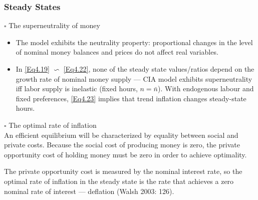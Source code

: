 \documentclass[handout]{beamer}
\begin{document}
\begin{frame}
\small

\frametitle{Steady States}

$\square$ The superneutrality of money \\

\begin{itemize}
\item The model exhibits the neutrality property: proportional
changes in the level of nominal money balances and prices do not affect real
variables.
\item In \eqref{Eq4.19} $\backsim$ \eqref{Eq4.22}, none of the steady
state values/ratios depend on the growth rate of nominal money
supply --- CIA model exhibits superneutrality iff labor supply is
inelastic (fixed hours, $n=\bar n$). With endogenous labour and fixed preferences, \eqref{Eq4.23} implies that trend inflation changes steady-state hours.
\end{itemize}
\pause

$\square$ The optimal rate of inflation \\

An efficient equilibrium will be characterized by
equality between social and private costs. Because the social cost
of producing money is zero, the private opportunity cost of holding
money must be zero in order to achieve optimality.\\\vskip 0.05in

The private opportunity cost is measured by the nominal interest
rate, so the optimal rate of inflation in the steady state is the
rate that achieves a zero nominal rate of interest --- deflation
(Walsh 2003: 126).

\end{frame}
\end{document}
